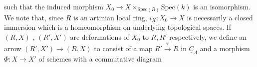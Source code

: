 
such that the induced morphism $X_0 \to X \times_{\mathrm{Spec}(R)} \mathrm{Spec}(k)$ is an isomorphism. We note that, since $R$ is an artinian local ring, $i_X : X_0 \to X$ is necessarily a closed immersion which is a homeomorphism on underlying topological spaces. If $(R, X)$ , $(R', X')$ are deformations of $X_0$ to $R, R'$ respectively, we define an arrow $(R', X') \to (R, X)$ to consist of a map $R' \xrightarrow{\ \varphi\ } R$ in $\underline{C}_\Lambda$ and a morphism $\Phi : X \to X'$ of schemes with a commutative diagram

